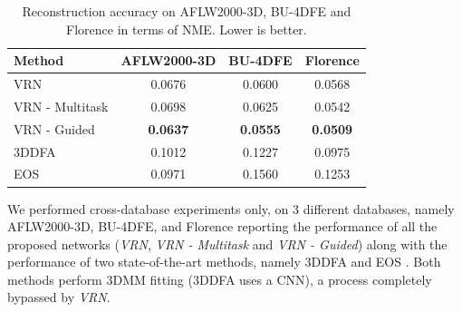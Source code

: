 \begin{table}
  \caption[Numerical performance of 3D face
  reconstruction]{Reconstruction accuracy on AFLW2000-3D, BU-4DFE and
    Florence in terms of NME. Lower is better.}
  \label{tab:overview}
  \centering
  \small
  \begin{tabular}{|l||c|c|c|}
    \hline
    \textbf{Method}   & \textbf{AFLW2000-3D} & \textbf{BU-4DFE} & \textbf{Florence} \\
    \hline\hline
    VRN & 0.0676   & 0.0600 & 0.0568   \\
    VRN - Multitask   & 0.0698        & 0.0625     & 0.0542        \\
    VRN - Guided    & \textbf{0.0637}   & \textbf{0.0555} & \textbf{0.0509}   \\
    \hline
    3DDFA~\cite{zhu2016face}             & 0.1012   & 0.1227 & 0.0975   \\
    EOS~\cite{huber2016multiresolution}  & 0.0971   & 0.1560 & 0.1253   \\
    \hline
  \end{tabular}
  \vspace{-4mm}
\end{table}


We performed cross-database experiments only, on 3 different
databases, namely AFLW2000-3D, BU-4DFE, and Florence reporting the
performance of all the proposed networks (\textit{VRN}, \textit{VRN -
  Multitask} and \textit{VRN - Guided}) along with the performance of
two state-of-the-art methods, namely 3DDFA \cite{zhu2016face} and EOS
\cite{huber2016multiresolution}. Both methods perform 3DMM
fitting (3DDFA uses a CNN), a process completely bypassed by \textit{VRN}.


